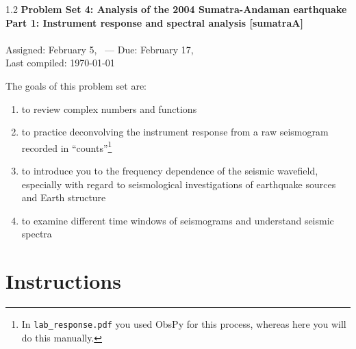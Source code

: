 \documentclass[11pt,titlepage,fleqn]{article}
\begin{document}

\begin{spacing}{1.2}
\centering
{\large \bf Problem Set 4: Analysis of the 2004 Sumatra-Andaman earthquake \\
Part 1: Instrument response and spectral analysis [sumatraA] \\ }
\cltag\ \\
Assigned: February 5, \cyear\ --- Due: February 17, \cyear\ \\
Last compiled: \today
\end{spacing}


\bigskip
\noindent
The goals of this problem set are:
%
\begin{enumerate}
\item to review complex numbers and functions
\item to practice deconvolving the instrument response from a raw seismogram recorded in ``counts''\footnote{In {\tt lab\_response.pdf} you used ObsPy for this process, whereas here you will do this manually.}
\item to introduce you to the frequency dependence of the seismic wavefield, especially with regard to seismological investigations of earthquake sources and Earth structure
\item to examine different time windows of seismograms and understand seismic spectra
\end{enumerate}

\section*{Instructions}
\end{document}
